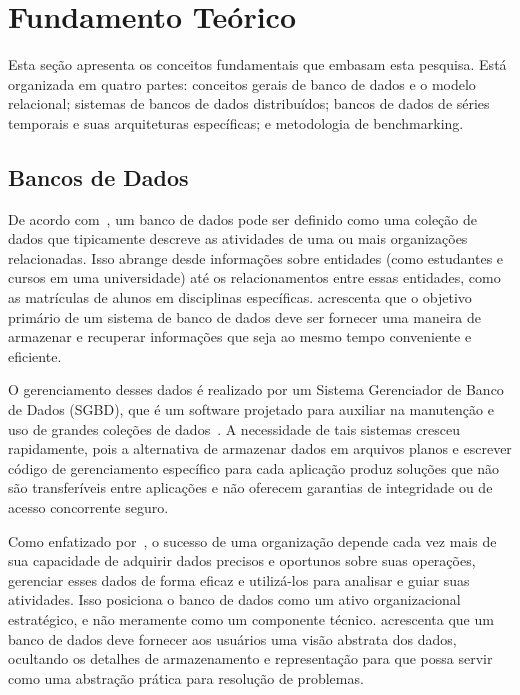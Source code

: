 \section{Fundamento Teórico}
\label{sec:theoretical}

Esta seção apresenta os conceitos fundamentais que embasam esta pesquisa. Está organizada em
quatro partes: conceitos gerais de banco de dados e o modelo relacional; sistemas de bancos de
dados distribuídos; bancos de dados de séries temporais e suas arquiteturas específicas; e
metodologia de benchmarking.

\subsection{Bancos de Dados}

De acordo com~\cite{Ramakrishnan2003}, um banco de dados pode ser definido como uma coleção de
dados que tipicamente descreve as atividades de uma ou mais organizações relacionadas.
Isso abrange desde informações sobre entidades (como estudantes e cursos em uma universidade)
até os relacionamentos entre essas entidades, como as matrículas de alunos em disciplinas
específicas. \cite{Silberschatz2020} acrescenta que o objetivo primário de um sistema de banco de
dados deve ser fornecer uma maneira de armazenar e recuperar informações que seja ao mesmo tempo
conveniente e eficiente.

O gerenciamento desses dados é realizado por um Sistema Gerenciador de Banco de Dados (SGBD),
que é um software projetado para auxiliar na manutenção e uso de grandes coleções de
dados~\cite{Ramakrishnan2003}. A necessidade de tais sistemas cresceu rapidamente, pois a
alternativa de armazenar dados em arquivos planos e escrever código de gerenciamento específico
para cada aplicação produz soluções que não são transferíveis entre aplicações e não oferecem
garantias de integridade ou de acesso concorrente seguro.

Como enfatizado por~\cite{Ramakrishnan2003}, o sucesso de uma organização depende cada vez mais
de sua capacidade de adquirir dados precisos e oportunos sobre suas operações, gerenciar esses
dados de forma eficaz e utilizá-los para analisar e guiar suas atividades. Isso posiciona o banco
de dados como um ativo organizacional estratégico, e não meramente como um componente técnico.
\cite{Silberschatz2020} acrescenta que um banco de dados deve fornecer aos usuários uma visão
abstrata dos dados, ocultando os detalhes de armazenamento e representação para que possa servir
como uma abstração prática para resolução de problemas.

